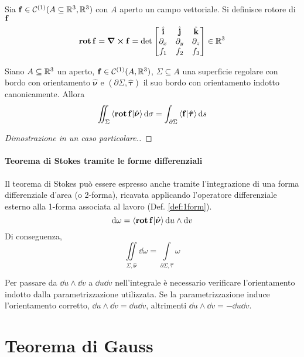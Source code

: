 \begin{definition}
	[Rotore]
	Sia $\vb{f}\in \mathcal{C}^{(1)}(A\subseteq \mathbb{R}^3,\mathbb{R}^3)$ con $A$ aperto un campo vettoriale. Si definisce rotore di $\vb{f}$
	$$
		\operatorname{\vb{rot}} \vb{f}=\curl \vb{f}=\det
		\begin{bmatrix}
			\hat{\vb{i}} & \hat{\vb{j}} & \hat{\vb{k}}\\
			\partial_x & \partial_y & \partial_z\\
			f_1 & f_2 & f_3
		\end{bmatrix}
		\in \mathbb{R}^3
	$$
\end{definition}

\begin{theorem}
	Siano $A \subseteq \mathbb{R}^3$ un aperto, $\vb{f} \in \mathcal{C}^{(1)}(A,\mathbb{R}^3)$, $\Sigma \subseteq A$ una superficie regolare con bordo con orientamento $\hat{\bm \nu}$ e $(\partial \Sigma,\hat{\bm \tau})$ il suo bordo con orientamento indotto canonicamente. Allora
	$$
		\iint_\Sigma \ip{\rot \vb{f}}{\hat{\bm \nu}}\dd \sigma = \int_{\partial\Sigma}\ip{\vb{f}}{\hat{\bm \tau}}\dd s
	$$
\end{theorem}

\begin{proof}
	[Dimostrazione in un caso particolare.]
\end{proof}

\paragraph{Teorema di Stokes tramite le forme differenziali}

Il teorema di Stokes può essere espresso anche tramite l'integrazione di una forma differenziale d'area (o 2-forma), ricavata applicando l'operatore differenziale esterno alla 1-forma associata al lavoro (Def. \ref{def:1form}).
$$
	\dd \omega = \ip{\rot \vb{f}}{\hat{\bm \nu}} \dd u \wedge \dd v
$$
Di conseguenza,
$$
	\iint\limits_{\Sigma,\hat{\bm \nu}} \dd \omega = \int\limits_{\partial \Sigma,\hat{\bm \tau}} \omega
$$

\begin{remark}
	Per passare da $\dd u \wedge \dd v$ a $\dd u \dd v$ nell'integrale è necessario verificare l'orientamento indotto dalla parametrizzazione utilizzata. Se la parametrizzazione induce l'orientamento corretto, $\dd u \wedge \dd v = \dd u \dd v$, altrimenti $\dd u \wedge \dd v= -\dd u \dd v$.  
\end{remark}

\section{Teorema di Gauss}

